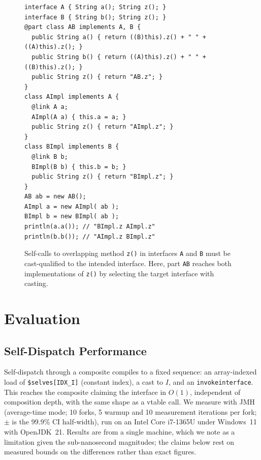 \documentclass[acmsmall,nonacm]{acmart}
\theoremstyle{acmplain}
\newcommand{\code}[1]{\texttt{#1}}
\begin{document}
\begin{figure}[H]
\begin{lstlisting}
interface A { String a(); String z(); }
interface B { String b(); String z(); }
@part class AB implements A, B {
  public String a() { return ((B)this).z() + " " + ((A)this).z(); }
  public String b() { return ((A)this).z() + " " + ((B)this).z(); }
  public String z() { return "AB.z"; }
}
class AImpl implements A {
  @link A a;
  AImpl(A a) { this.a = a; }
  public String z() { return "AImpl.z"; }
}
class BImpl implements B {
  @link B b;
  BImpl(B b) { this.b = b; }
  public String z() { return "BImpl.z"; }
}
AB ab = new AB();
AImpl a = new AImpl( ab );
BImpl b = new BImpl( ab );
println(a.a()); // "BImpl.z AImpl.z"
println(b.b()); // "AImpl.z BImpl.z"
\end{lstlisting}
\caption{Self-calls to overlapping method \code{z()} in interfaces \code{A} and \code{B} must be cast-qualified to the intended
interface. Here, part \code{AB} reaches both implementations of \code{z()} by selecting the target interface with casting.}
\label{fig:overlapCall-listing}
\end{figure}

\section{Evaluation}
\label{sec:eval}

\subsection{Self-Dispatch Performance}

Self-dispatch through a composite compiles to a fixed sequence: an array-indexed
load of \code{\$selves[IDX\_I]} (constant index), a cast to $I$, and an
\code{invokeinterface}. This reaches the composite claiming the interface in
$O(1)$, independent of composition depth, with the same shape as a vtable call.
We measure with JMH~\cite{jmh} (average-time mode; 10 forks, 5 warmup and 10
measurement iterations per fork; $\pm$ is the 99.9\% CI half-width), run on an
Intel Core i7-1365U under Windows~11 with OpenJDK~21. Results are from a single
machine, which we note as a limitation given the sub-nanosecond magnitudes; the
claims below rest on measured bounds on the differences rather than exact
figures.
\end{document}
